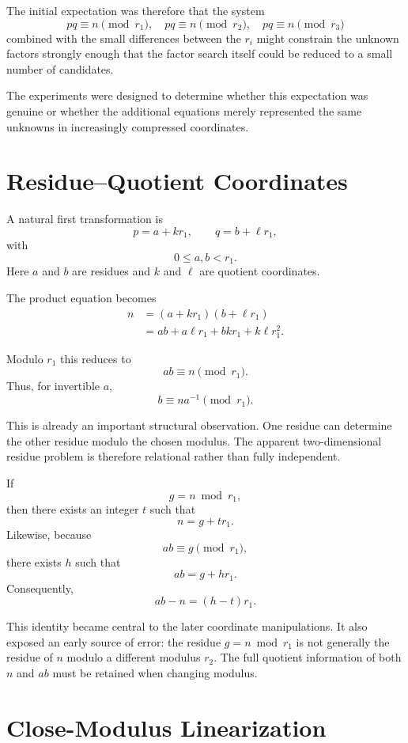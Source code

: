 \documentclass[11pt,a4paper]{article}
\begin{document}
The initial expectation was therefore that the system
\[
    pq\equiv n\pmod{r_1},
    \quad
    pq\equiv n\pmod{r_2},
    \quad
    pq\equiv n\pmod{r_3}
\]
combined with the small differences between the $r_i$ might constrain the unknown factors strongly enough that the factor search itself could be reduced to a small number of candidates.

The experiments were designed to determine whether this expectation was genuine or whether the additional equations merely represented the same unknowns in increasingly compressed coordinates.

\section{Residue--Quotient Coordinates}

A natural first transformation is
\[
    p=a+kr_1,
    \qquad
    q=b+\ell r_1,
\]
with
\[
    0\leq a,b<r_1.
\]
Here $a$ and $b$ are residues and $k$ and $\ell$ are quotient coordinates.

The product equation becomes
\begin{align}
    n
    &= (a+kr_1)(b+\ell r_1)\\
    &=ab+a\ell r_1+bk r_1+k\ell r_1^2.
\end{align}

Modulo $r_1$ this reduces to
\[
    ab\equiv n\pmod{r_1}.
\]
Thus, for invertible $a$,
\[
    b\equiv na^{-1}\pmod{r_1}.
\]

This is already an important structural observation. One residue can determine the other residue modulo the chosen modulus. The apparent two-dimensional residue problem is therefore relational rather than fully independent.

If
\[
    g=n\bmod r_1,
\]
then there exists an integer $t$ such that
\[
    n=g+tr_1.
\]
Likewise, because
\[
    ab\equiv g\pmod{r_1},
\]
there exists $h$ such that
\[
    ab=g+hr_1.
\]
Consequently,
\[
    ab-n=(h-t)r_1.
\]

This identity became central to the later coordinate manipulations. It also exposed an early source of error: the residue $g=n\bmod r_1$ is not generally the residue of $n$ modulo a different modulus $r_2$. The full quotient information of both $n$ and $ab$ must be retained when changing modulus.

\section{Close-Modulus Linearization}
\end{document}
